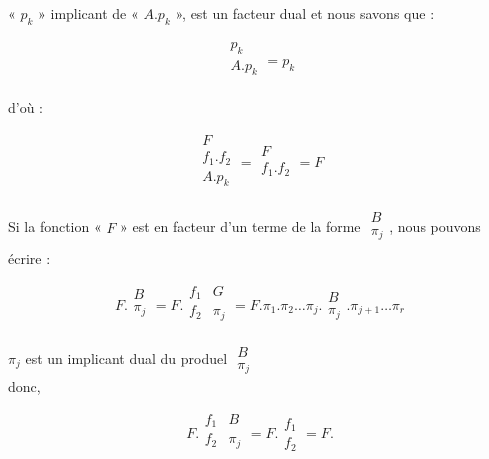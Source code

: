  « $p_k$ » implicant de « $A . p_k$ », est un facteur dual et nous savons que : 
 
\[ 
\begin{array}{|c|}
     p_k \\ 
     A . p_k \\ 
\end{array} 
     = p_k 
\] 
 
 
 d'où : 
 
\[ \begin{array}{|c|} F  \\ f_1 . f_2  \\ A . p_k \\ \end{array} 
   = \begin{array}{|c|} F \\ f_1 . f_2  \\ \end{array}  = F \] 
  
  Si la fonction « $F$ » est en facteur d'un terme de la forme $\begin{array}{|c|}
    B \\ 
     \pi_j \\ 
\end{array}$, nous pouvons écrire : 
  
\[ F . \begin{array}{|c|} B \\ \pi_j \\ \end{array} = F . \begin{array}{|c|c|} f_1 & G \\ f_2 & \pi_j \\ \end{array}
    = F . \pi_1 . \pi_2\ldots \pi_j . \begin{array}{|c|} B \\ \pi_j \end{array} . \pi_{j+1}\ldots \pi_r   \]
    
$\pi_j$ est un implicant dual du produel      $\begin{array}{|c|} B \\ \pi_j \end{array}$ \\
donc, 

\[ F . \begin{array}{|c|c|} f_1 & B \\ f_2 & \pi_j \\ \end{array} 
        = F . \begin{array}{|c|} f_1 \\ f_2 \end{array} = F \text{.}    
\] 

